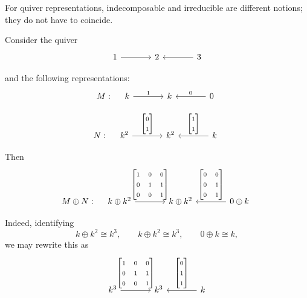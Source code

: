 \documentclass[11pt, a4paper]{report}
\begin{document}
\begin{remark}
For quiver representations, indecomposable and irreducible are different notions; they do not have to coincide.
\end{remark}

\begin{example}
    Consider the quiver
    \[
    \begin{tikzcd}[column sep=large]
    1 \arrow[r] & 2 & 3 \arrow[l]
    \end{tikzcd}
    \]
    
    and the following representations:
    \[
    M:\quad
    \begin{tikzcd}[column sep=large]
    k \arrow[r, "1"] & k & 0 \arrow[l, "0"']
    \end{tikzcd}
    \]
    
    \[
    N:\quad
    \begin{tikzcd}[column sep=large]
    k^2 \arrow[r, "{\begin{bmatrix}0\\1\end{bmatrix}}"] &
    k^2 &
    k \arrow[l, "{\begin{bmatrix}1\\1\end{bmatrix}}"']
    \end{tikzcd}
    \]
    
    Then
    \[
    M\oplus N:\quad
    \begin{tikzcd}[ampersand replacement=\&, column sep=large]
    k\oplus k^2 \arrow[r, "{\begin{bmatrix}
    1 & 0 & 0\\
    0 & 1 & 1\\
    0 & 0 & 1\\
    \end{bmatrix}}"] \&
    k\oplus k^2 \&
    0\oplus k \arrow[l, "{\begin{bmatrix}
    0 & 0\\
    0 & 1\\
    0 & 1\\
    \end{bmatrix}}"']
    \end{tikzcd}
    \]
    
    Indeed, identifying
    \[
    k\oplus k^2 \cong k^3,\qquad
    k\oplus k^2 \cong k^3,\qquad
    0\oplus k \cong k,
    \]
    we may rewrite this as
    \[
    \begin{tikzcd}[ampersand replacement=\&,column sep=large]
    k^3 \arrow[r, "{\begin{bmatrix}
        1 & 0 & 0\\
        0 & 1 & 1\\
        0 & 0 & 1\\
        \end{bmatrix}}"] \&
    k^3 \&
    k \arrow[l, "{\begin{bmatrix}
    0\\
    1\\
    1
    \end{bmatrix}}"']
    \end{tikzcd}
    \]
    \end{example}
\end{document}
